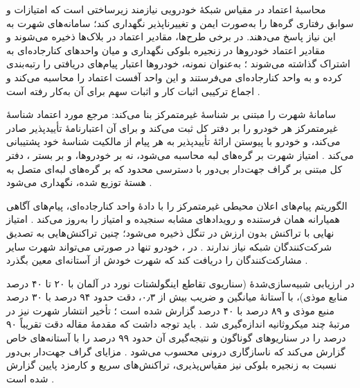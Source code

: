 \documentclass[12pt,a4paper]{article}
\begin{document}
محاسبهٔ اعتماد در مقیاس شبکهٔ خودرویی نیازمند زیرساختی است که امتیازات و سوابق رفتاری گره‌ها را به‌صورت ایمن و تغییرناپذیر نگهداری کند؛ سامانه‌های شهرت به این نیاز پاسخ می‌دهند. در برخی طرح‌ها، مقادیر اعتماد در بلاک‌ها ذخیره می‌شوند \cite{razaBlockchainBasedReputationTrust2024} و مقادیر اعتماد خودرو‌ها در زنجیره بلوکی نگهداری و میان واحد‌های کنارجاده‌ای به اشتراک گذاشته می‌شوند \cite{farsimadanReviewSecurityChallenges2025}؛ به‌عنوان نمونه، خودرو‌ها اعتبار پیام‌های دریافتی را رتبه‌بندی کرده و به واحد کنارجاده‌ای می‌فرستند و این واحد آفست اعتماد را محاسبه می‌کند \cite{razaBlockchainBasedReputationTrust2024} و اجماع ترکیبی اثبات کار و اثبات سهم برای آن به‌کار رفته است \cite{razaBlockchainBasedReputationTrust2024}.

سامانهٔ  شهرت را مبتنی بر شناسهٔ غیرمتمرکز بنا می‌کند: مرجع مورد اعتماد شناسهٔ غیرمتمرکز هر خودرو را بر دفتر کل ثبت می‌کند و برای آن اعتبارنامهٔ تأییدپذیر صادر می‌کند، و خودرو با پیوستن ارائهٔ تأییدپذیر به هر پیام از مالکیت شناسهٔ خود پشتیبانی می‌کند \cite{feraudoDIVADIDbasedReputation2024}. امتیاز شهرت بر گره‌های لبه محاسبه می‌شود، نه بر خودروها، و بر بستر ، دفتر کل مبتنی بر گراف جهت‌دار بی‌دور با دسترسی محدود  که بر گره‌های لبه‌ای متصل به هستهٔ  توزیع شده، نگهداری می‌شود \cite{feraudoDIVADIDbasedReputation2024}.

الگوریتم  پیام‌های اعلان محیطی غیرمتمرکز را با دادهٔ واحد کنارجاده‌ای، پیام‌های آگاهی همیارانه همان فرستنده و رویداد‌های مشابه سنجیده و امتیاز را به‌روز می‌کند \cite{feraudoDIVADIDbasedReputation2024}. امتیاز نهایی با تراکنش بدون ارزش در تنگل ذخیره می‌شود؛ چنین تراکنش‌هایی به تصدیق شرکت‌کنندگان شبکه نیاز ندارند \cite{feraudoDIVADIDbasedReputation2024}. در ، خودرو تنها در صورتی می‌تواند شهرت سایر مشارکت‌کنندگان را دریافت کند که شهرت خودش از آستانه‌ای معین بگذرد \cite{feraudoDIVADIDbasedReputation2024}.

در ارزیابی شبیه‌سازی‌شدهٔ  (سناریوی تقاطع اینگولشتات نورد در آلمان با ۲۰ تا ۴۰ درصد منابع موذی)، با آستانهٔ میانگین و ضریب  بیش از ۰٫۳، دقت حدود ۹۴ درصد با ۳۰ درصد منبع موذی و ۸۹ درصد با ۴۰ درصد گزارش شده است \cite{feraudoDIVADIDbasedReputation2024}؛ تأخیر انتشار شهرت نیز در مرتبهٔ چند میکروثانیه اندازه‌گیری شد \cite{feraudoDIVADIDbasedReputation2024}. باید توجه داشت که مقدمهٔ مقاله دقت تقریباً ۹۰ درصد را در سناریو‌های گوناگون و نتیجه‌گیری آن حدود ۹۹ درصد را با آستانه‌های خاص گزارش می‌کند که ناسازگاری درونی محسوب می‌شود \cite{feraudoDIVADIDbasedReputation2024}. مزایای گراف جهت‌دار بی‌دور نسبت به زنجیره بلوکی نیز مقیاس‌پذیری، تراکنش‌های سریع و کارمزد پایین گزارش شده است \cite{feraudoDIVADIDbasedReputation2024}.
\end{document}
